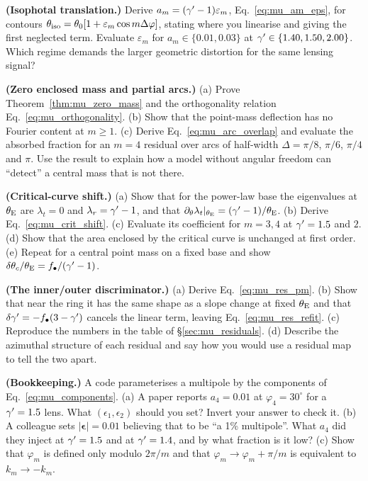 \begin{exercise}
\label{ex:mu_isophote}
\textbf{(Isophotal translation.)}
Derive $a_m=(\gamma'-1)\varepsilon_m$, Eq.~\eqref{eq:mu_am_eps}, for
contours $\theta_{\rm iso}=\theta_0[1+\varepsilon_m\cos m\Delta\varphi]$,
stating where you linearise and giving the first neglected term.
Evaluate $\varepsilon_m$ for $a_m\in\{0.01,0.03\}$ at
$\gamma'\in\{1.40,1.50,2.00\}$.  Which regime demands the larger
geometric distortion for the same lensing signal?
\end{exercise}

\begin{exercise}
\label{ex:mu_zero_mass}
\textbf{(Zero enclosed mass and partial arcs.)}
(a) Prove Theorem~\ref{thm:mu_zero_mass} and the orthogonality
relation Eq.~\eqref{eq:mu_orthogonality}.  (b) Show that the point-mass
deflection has no Fourier content at $m\ge1$.  (c) Derive
Eq.~\eqref{eq:mu_arc_overlap} and evaluate the absorbed fraction for an
$m=4$ residual over arcs of half-width $\Delta = \pi/8$, $\pi/6$,
$\pi/4$ and $\pi$.  Use the result to explain how a model without
angular freedom can ``detect'' a central mass that is not there.
\end{exercise}

\begin{exercise}
\label{ex:mu_critical}
\textbf{(Critical-curve shift.)}
(a) Show that for the power-law base the eigenvalues at $\theta_{\mathrm{E}}$ are
$\lambda_t=0$ and $\lambda_r=\gamma'-1$, and that
$\partial_\theta\lambda_t|_{\theta_{\mathrm{E}}} = (\gamma'-1)/\theta_{\mathrm{E}}$.
(b) Derive Eq.~\eqref{eq:mu_crit_shift}.  (c) Evaluate its coefficient
for $m=3,4$ at $\gamma'=1.5$ and $2$.  (d) Show that the area enclosed by
the critical curve is unchanged at first order.  (e) Repeat for a
central point mass on a fixed base and show
$\delta\theta_c/\theta_{\mathrm{E}} = f_\bullet/(\gamma'-1)$.
\end{exercise}

\begin{exercise}
\label{ex:mu_residual}
\textbf{(The inner/outer discriminator.)}
(a) Derive Eq.~\eqref{eq:mu_res_pm}.  (b) Show that near the ring it
has the same shape as a slope change at fixed $\theta_{\mathrm{E}}$ and that
$\delta\gamma' = -f_\bullet(3-\gamma')$ cancels the linear term, leaving
Eq.~\eqref{eq:mu_res_refit}.  (c) Reproduce the numbers in the table
of \S\ref{sec:mu_residuals}.  (d) Describe the azimuthal structure of
each residual and say how you would use a residual map to tell the two
apart.
\end{exercise}

\begin{exercise}
\label{ex:mu_convention}
\textbf{(Bookkeeping.)}
A code parameterises a multipole by the components of
Eq.~\eqref{eq:mu_components}.  (a) A paper reports $a_4=0.01$ at
$\varphi_4=30^\circ$ for a $\gamma'=1.5$ lens.  What
$(\epsilon_1,\epsilon_2)$ should you set?  Invert your answer to check
it.  (b) A colleague sets $|\boldsymbol{\epsilon}|=0.01$ believing that
to be ``a 1\% multipole''.  What $a_4$ did they inject at $\gamma'=1.5$ and
at $\gamma'=1.4$, and by what fraction is it low?  (c) Show that
$\varphi_m$ is defined only modulo $2\pi/m$ and that
$\varphi_m\to\varphi_m+\pi/m$ is equivalent to $k_m\to-k_m$.
\end{exercise}

